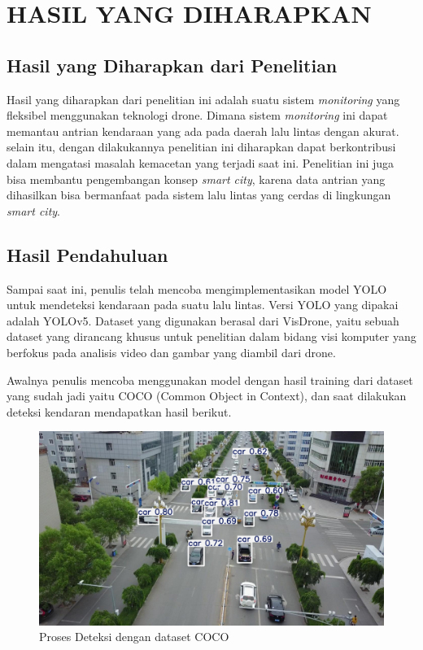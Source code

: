 \chapter{HASIL YANG DIHARAPKAN}

\section{Hasil yang Diharapkan dari Penelitian}

Hasil yang diharapkan dari penelitian ini adalah suatu sistem \emph{monitoring} yang fleksibel menggunakan teknologi drone. Dimana sistem \emph{monitoring} ini dapat memantau antrian kendaraan yang ada pada daerah lalu lintas dengan akurat. selain itu, dengan dilakukannya penelitian ini diharapkan dapat berkontribusi dalam mengatasi masalah kemacetan yang terjadi saat ini. Penelitian ini juga bisa membantu pengembangan konsep \emph{smart city}, karena data antrian yang dihasilkan bisa bermanfaat pada sistem lalu lintas yang cerdas di lingkungan \emph{smart city}.

\section{Hasil Pendahuluan}

Sampai saat ini, penulis telah mencoba mengimplementasikan model YOLO untuk mendeteksi kendaraan pada suatu lalu lintas. Versi YOLO yang dipakai adalah YOLOv5. Dataset yang digunakan berasal dari VisDrone, yaitu sebuah dataset yang dirancang khusus untuk penelitian dalam bidang visi komputer yang berfokus pada analisis video dan gambar yang diambil dari drone.

Awalnya penulis mencoba menggunakan model dengan hasil training dari dataset yang sudah jadi yaitu COCO (Common Object in Context), dan saat dilakukan deteksi kendaran mendapatkan hasil berikut.
\begin{figure} [H] \centering
    \includegraphics[scale=0.3]{gambar/coco_1.jpg}
    \caption{Proses Deteksi dengan dataset COCO}
    \label{fig:deteksi_kendaraan_coco1}
  \end{figure}
  
